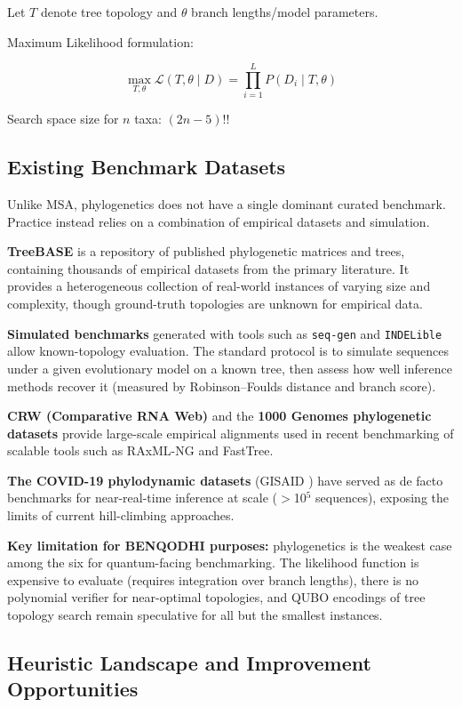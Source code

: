\documentclass[11pt]{article}
\begin{document}
Let $T$ denote tree topology and $\theta$ branch lengths/model parameters.

Maximum Likelihood formulation:

\[
\max_{T,\theta} \mathcal{L}(T,\theta \mid D)
= \prod_{i=1}^{L} P(D_i \mid T, \theta)
\]

Search space size for $n$ taxa: $(2n-5)!!$

\subsection*{Existing Benchmark Datasets}

Unlike MSA, phylogenetics does not have a single dominant curated benchmark.
Practice instead relies on a combination of empirical datasets and simulation.

\textbf{TreeBASE} \cite{TreeBASE} is a repository of published phylogenetic matrices and
trees, containing thousands of empirical datasets from the primary literature. It provides
a heterogeneous collection of real-world instances of varying size and complexity, though
ground-truth topologies are unknown for empirical data.

\textbf{Simulated benchmarks} generated with tools such as
\texttt{seq-gen} \cite{Rambaut1997} and \texttt{INDELible} \cite{Fletcher2009} allow
known-topology evaluation. The standard protocol is to simulate sequences under a given
evolutionary model on a known tree, then assess how well inference methods recover it
(measured by Robinson--Foulds distance \cite{Robinson1981} and branch score).

\textbf{CRW (Comparative RNA Web)} \cite{CRW2002} and the \textbf{1000 Genomes
phylogenetic datasets} provide large-scale empirical alignments used in recent
benchmarking of scalable tools such as RAxML-NG and FastTree.

\textbf{The COVID-19 phylodynamic datasets} (GISAID \cite{GISAID}) have served as
de facto benchmarks for near-real-time inference at scale ($>$10$^5$ sequences),
exposing the limits of current hill-climbing approaches.

\textbf{Key limitation for BENQODHI purposes:} phylogenetics is the weakest case among the
six for quantum-facing benchmarking. The likelihood function is expensive to evaluate
(requires integration over branch lengths), there is no polynomial verifier for
near-optimal topologies, and QUBO encodings of tree topology search remain
speculative for all but the smallest instances.

\subsection*{Heuristic Landscape and Improvement Opportunities}
\end{document}
